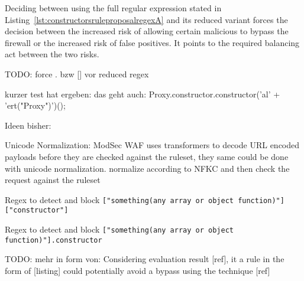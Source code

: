 Deciding between using the full regular expression stated in Listing~\ref{lst:constructorsruleproposalregexA} and its reduced variant forces the decision between the increased risk of allowing certain malicious to bypass the firewall or the increased risk of false positives. It points to the required balancing act between the two risks.

TODO: force . bzw [] vor reduced regex






{\color{blue}kurzer test hat ergeben: das geht auch: Proxy.constructor.constructor('al' + 'ert("Proxy")')(); }




{\color{red}Ideen bisher:}

Unicode Normalization: ModSec WAF uses transformers to decode URL encoded payloads before they are checked against the ruleset, they same could be done with unicode normalization. normalize according to NFKC and then check the request against the ruleset

Regex to detect and block \verb|["something(any array or object function)"]["constructor"]|

Regex to detect and block \verb|["something(any array or object function)"].constructor|






{\color{red} TODO: mehr in form von: Considering evaluation result [ref], it a rule in the form of [listing] could potentially avoid a bypass using the technique [ref]}
